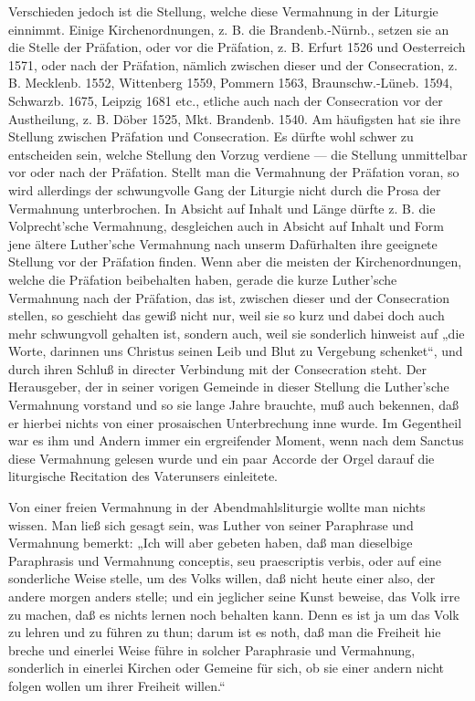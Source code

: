 Verschieden jedoch ist die Stellung, welche diese Vermahnung in der Liturgie einnimmt. Einige Kirchenordnungen, z. B. die Brandenb.-Nürnb., setzen sie an die Stelle der Präfation, oder vor die Präfation, z. B. Erfurt 1526 und Oesterreich 1571, oder nach der Präfation, nämlich zwischen dieser und der Consecration, z. B. Mecklenb. 1552, Wittenberg 1559, Pommern 1563, Braunschw.-Lüneb. 1594, Schwarzb. 1675, Leipzig 1681 etc., etliche auch nach der Consecration vor der Austheilung, z. B. Döber 1525, Mkt. Brandenb. 1540. Am häufigsten hat sie ihre Stellung zwischen Präfation und Consecration. Es dürfte wohl schwer zu entscheiden sein, welche Stellung den Vorzug verdiene — die Stellung unmittelbar vor oder nach der Präfation. Stellt man die Vermahnung der Präfation voran, so wird allerdings der schwungvolle Gang der Liturgie nicht durch die Prosa der Vermahnung unterbrochen. In Absicht auf Inhalt und Länge dürfte z. B. die Volprecht’sche Vermahnung, desgleichen auch in Absicht auf Inhalt und Form jene ältere
Luther’sche Vermahnung nach unserm Dafürhalten ihre geeignete Stellung vor der Präfation finden. Wenn aber die meisten der Kirchenordnungen, welche die Präfation beibehalten haben, gerade die kurze Luther’sche Vermahnung nach der Präfation, das ist, zwischen dieser und der Consecration stellen, so geschieht das gewiß nicht nur, weil sie so kurz und dabei doch auch mehr schwungvoll gehalten ist, sondern auch, weil sie sonderlich hinweist auf „die Worte, darinnen uns Christus seinen Leib und Blut zu Vergebung schenket“, und durch ihren Schluß in directer Verbindung mit der Consecration steht. Der Herausgeber, der in seiner vorigen Gemeinde in dieser Stellung die Luther’sche Vermahnung vorstand und so sie lange Jahre brauchte, muß auch bekennen, daß er hierbei nichts von einer prosaischen Unterbrechung inne wurde. Im Gegentheil war es ihm und Andern immer ein ergreifender Moment, wenn nach dem Sanctus diese Vermahnung gelesen wurde und ein paar Accorde der Orgel darauf die liturgische Recitation des Vaterunsers einleitete.

Von einer freien Vermahnung in der Abendmahlsliturgie wollte man nichts wissen. Man ließ sich gesagt sein, was Luther von seiner Paraphrase und Vermahnung bemerkt: „Ich will aber gebeten haben, daß man dieselbige Paraphrasis und Vermahnung conceptis, seu praescriptis verbis, oder auf eine sonderliche Weise stelle, um des Volks willen, daß nicht heute einer also, der andere morgen anders stelle; und ein jeglicher seine Kunst beweise, das Volk irre zu machen, daß es nichts lernen noch behalten kann. Denn es ist ja um das Volk zu lehren und zu führen zu thun; darum ist es noth, daß man die Freiheit hie breche und einerlei Weise führe in solcher Paraphrasie und Vermahnung, sonderlich in einerlei Kirchen oder Gemeine für sich, ob sie einer andern nicht folgen wollen um ihrer Freiheit willen.“

